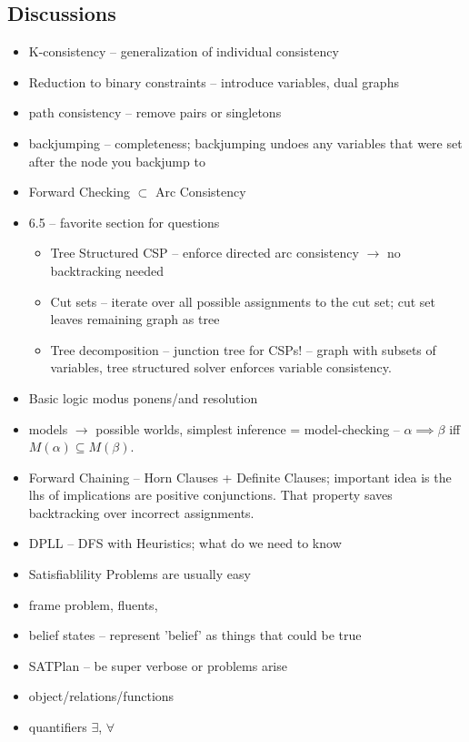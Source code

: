 \subsection*{Discussions}
\begin{itemize}
\item K-consistency -- generalization of individual consistency
\item Reduction to binary constraints -- introduce variables, dual graphs
\item path consistency -- remove pairs or singletons
\item backjumping -- completeness; backjumping undoes any variables that were set after the node you backjump to
\item Forward Checking $\subset$ Arc Consistency
\item 6.5 -- favorite section for questions
\begin{itemize}
  \item Tree Structured CSP -- enforce directed arc consistency $\rightarrow$ no backtracking needed
  \item Cut sets -- iterate over all possible assignments to the cut set; cut set leaves remaining graph as tree
  \item Tree decomposition -- junction tree for CSPs! -- graph with subsets of variables, tree structured solver enforces variable consistency. 
\end{itemize}
\item Basic logic modus ponens/and resolution
\item models $\rightarrow$ possible worlds, simplest inference = model-checking -- $\alpha \implies \beta$ iff $M(\alpha) \subseteq M(\beta)$.
\item Forward Chaining -- Horn Clauses + Definite Clauses; important idea is the lhs of implications are positive conjunctions. That property saves backtracking over incorrect assignments. 
\item DPLL -- DFS with Heuristics; what do we need to know
\item Satisfiablility Problems are usually easy
\item frame problem, fluents, 
\item belief states -- represent 'belief' as things that could be true
\item SATPlan -- be super verbose or problems arise
\item object/relations/functions
\item quantifiers $\exists$, $\forall$
\end{itemize}

